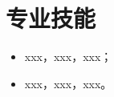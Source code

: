 \documentclass{resume}
\begin{document}
\section{专业技能}
\begin{itemize}
\item xxx，xxx，xxx；
\item xxx，xxx，xxx。
\end{itemize}


%
%
\end{document}
